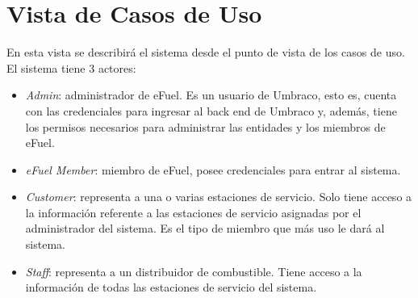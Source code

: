     \section{Vista de Casos de Uso} \label{vistaCasosDeUso}
    En esta vista se describirá el sistema desde el punto de vista de los casos de uso. El sistema tiene 3 actores:

    \begin{itemize}
        \item \emph{Admin}: administrador de eFuel. Es un usuario de Umbraco, esto es, cuenta con las credenciales para ingresar al back end de Umbraco y, además, tiene los permisos necesarios para administrar las entidades y los miembros de eFuel.
        \item \emph{eFuel Member}: miembro de eFuel, posee credenciales para entrar al sistema.
        \item \emph{Customer}: representa a una o varias estaciones de servicio. Solo tiene acceso a la información referente a las estaciones de servicio asignadas por el administrador del sistema. Es el tipo de miembro que más uso le dará al sistema.
        \item \emph{Staff}: representa a un distribuidor de combustible. Tiene acceso a la información de todas las estaciones de servicio del sistema.
    \end{itemize}

